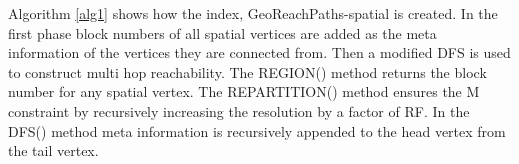 Algorithm \ref{alg1} shows how the index, GeoReachPaths-spatial is created. In the first phase block numbers of all spatial vertices are added as the meta information of the vertices they are connected from. Then a modified DFS is used to construct multi hop reachability. The REGION() method returns the block number for any spatial vertex. The REPARTITION() method ensures the M constraint by recursively increasing the resolution by a factor of RF. In the DFS() method meta information is recursively appended to the head vertex from the tail vertex.


